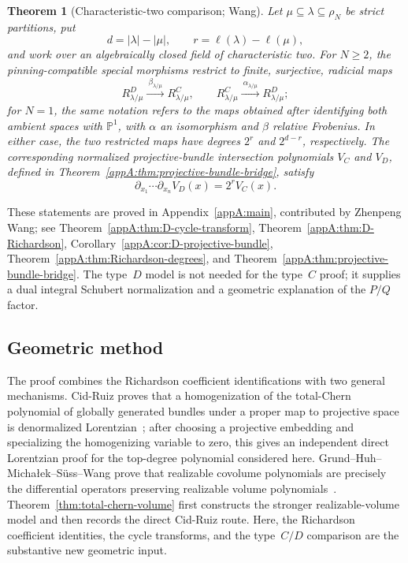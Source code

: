 \documentclass[11pt,a4paper,oneside]{amsart}
\numberwithin{equation}{section}
\newtheorem{theorem}{Theorem}[section]
\theoremstyle{definition}
\theoremstyle{remark}
\begin{document}
\begin{theorem}[Characteristic-two comparison; Wang]
\label{thm:intro-char2-comparison}
Let $\mu\subseteq\lambda\subseteq\rho_N$ be strict partitions, put
\[
 d=|\lambda|-|\mu|,
 \qquad
 r=\ell(\lambda)-\ell(\mu),
\]
and work over an algebraically closed field of characteristic two.  For
$N\geq2$, the pinning-compatible special morphisms restrict to finite,
surjective, radicial maps
\[
 R^D_{\lambda/\mu}\xrightarrow{\ \beta_{\lambda/\mu}\ }
 R^C_{\lambda/\mu},
 \qquad
 R^C_{\lambda/\mu}\xrightarrow{\ \alpha_{\lambda/\mu}\ }
 R^D_{\lambda/\mu};
\]
for $N=1$, the same notation refers to the maps obtained after identifying
both ambient spaces with $\mathbb P^1$, with $\alpha$ an isomorphism and
$\beta$ relative Frobenius.  In either case, the two restricted maps have
degrees $2^r$ and $2^{d-r}$, respectively.  The corresponding normalized
projective-bundle intersection polynomials $V_C$ and $V_D$, defined in
Theorem~\ref{appA:thm:projective-bundle-bridge}, satisfy
\[
 \partial_{x_1}\cdots\partial_{x_n}V_D(x)=2^rV_C(x).
\]
\end{theorem}

These statements are proved in Appendix~\ref{appA:main}, contributed by Zhenpeng Wang; see Theorem~\ref{appA:thm:D-cycle-transform}, Theorem~\ref{appA:thm:D-Richardson}, Corollary~\ref{appA:cor:D-projective-bundle}, Theorem~\ref{appA:thm:Richardson-degrees}, and Theorem~\ref{appA:thm:projective-bundle-bridge}.  The type~$D$ model is not needed for the type~$C$ proof; it supplies a dual integral Schubert normalization and a geometric explanation of the $P/Q$ factor.

\subsection{Geometric method}

The proof combines the Richardson coefficient identifications with two general mechanisms.  Cid-Ruiz proves that a homogenization of the total-Chern polynomial of globally generated bundles under a proper map to projective space is denormalized Lorentzian~\cite[Proposition~6.2]{CidRuiz26}; after choosing a projective embedding and specializing the homogenizing variable to zero, this gives an independent direct Lorentzian proof for the top-degree polynomial considered here.  Grund--Huh--Micha\l ek--S\"uss--Wang prove that realizable covolume polynomials are precisely the differential operators preserving realizable volume polynomials~\cite[Theorem~1.3]{GHMSW25}.  Theorem~\ref{thm:total-chern-volume} first constructs the stronger realizable-volume model and then records the direct Cid-Ruiz route. Here, the Richardson coefficient identities, the cycle transforms, and the type~$C/D$ comparison are the substantive new geometric input.
\end{document}
